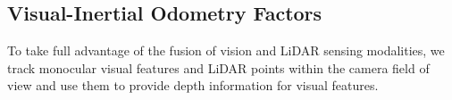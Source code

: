 
\subsection{Visual-Inertial Odometry Factors}
To take full advantage of the fusion of vision and LiDAR sensing modalities, we track monocular visual features and LiDAR points within the camera field of view and use them to provide depth information for visual features.


